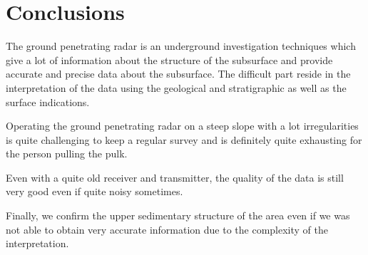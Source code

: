 \newpage
\section{Conclusions}

The ground penetrating radar is an underground investigation techniques which give a lot of information about the structure of the subsurface and provide accurate and precise data about the subsurface. The difficult part reside in the interpretation of the data using the geological and stratigraphic as well as the surface indications.

Operating the ground penetrating radar on a steep slope with a lot irregularities is quite challenging to keep a regular survey and is definitely quite exhausting for the person pulling the pulk.

Even with a quite old receiver and transmitter, the quality of the data is still very good even if quite noisy sometimes.

Finally, we confirm the upper sedimentary structure of the area even if we was not able to obtain very accurate information due to the complexity of the interpretation.

